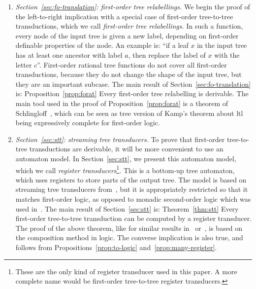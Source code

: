 \begin{enumerate}
    \item \emph{Section~\ref{sec:fo-translation}: first-order tree relabellings.} We begin the proof of the left-to-right  implication  with a special case of first-order tree-to-tree transductions, which we call \emph{first-order  tree relabellings.} In such a  function, every node of the input tree  is given a new label, depending on first-order definable properties of the node. An example is:  ``if a leaf $x$ in the input tree has at least one ancestor with label $a$, then replace the label of $x$ with the letter $c$''. First-order rational tree functions do not cover all first-order transductions, because they do not change the shape of the input tree, but they are an important subcase.
    The main result of Section~\ref{sec:fo-translation} is:
    \announce
    {Proposition~\ref{prop:forat}}
    {Every first-order tree relabelling is derivable.}
    The main tool used in the proof of Proposition~\ref{prop:forat} is a theorem of Schlingloff~\cite[Theorem 2.6]{schlingloff1992expressive}, which can be seen as tree version of Kamp's theorem about {\sc ltl} being  expressively complete for first-order logic.  
    \item \emph{Section~\ref{sec:stt}: streaming tree transducers. }To prove that  first-order tree-to-tree transductions are derivable, it will be more convenient to use an automaton model. In Section~\ref{sec:stt}, we present  this  automaton model, which we call \emph{register transducers}\footnote{These are the only kind of register transducer used in this paper. A more complete name would be first-order tree-to-tree register transducers.}. This  is a bottom-up tree automaton, which uses registers to store parts of the output tree. The model is based on streaming tree transducers from~\cite{alur2017streaming}, but it is  appropriately restricted so that it matches first-order logic, as opposed to monadic second-order logic which was used in~\cite{alur2017streaming}. The main result of Section~\ref{sec:stt} is:
    \announce
    {Theorem~\ref{thm:stt}}
    {Every first-order  tree-to-tree transduction can be computed by a  register transducer.}
    The proof of the above theorem, like for similar results in~\cite{alur2017streaming} or~\cite[Theorem 23]{engelfrietMSODefinableString2001}, is based on the composition method in logic. 
    The converse implication is also true, and follows from Propositions~\ref{prop:to-logic} and~\ref{prop:many-register}.
    

\end{enumerate}
